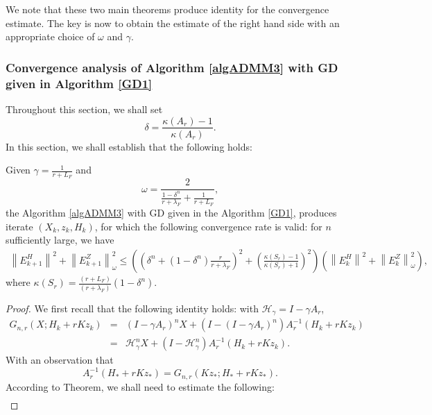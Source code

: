 \begin{itemize}
We note that these two main theorems produce identity for the convergence estimate. The key is now to obtain the estimate of the right hand side with an appropriate choice of $\omega$ and $\gamma$. 

\subsubsection{Convergence analysis of Algorithm \ref{algADMM3} with GD given in Algorithm \ref{GD1}}
Throughout this section, we shall set 
\begin{equation}
\delta = \frac{\kappa(A_r)-1}{\kappa(A_r)}. 
\end{equation} 
In this section, we shall establish that the following holds: 
\begin{theorem}\label{main:theorem04} 
Given $\gamma = \frac{1}{r + L_F}$ and \begin{equation}
\omega = \frac{2}{\frac{1 - \delta^n}{r + \lambda_F} + \frac{1}{r+L_F}}, 
\end{equation}
the Algorithm \ref{algADMM3} with GD given in the Algorithm \ref{GD1}, produces iterate $(X_k, z_k, H_k)$, for which the following convergence rate is valid: for $n$ sufficiently large, we have 
\begin{eqnarray*}
\left \|E_{k+1}^H \right \|^2 + \left \|E_{k+1}^Z \right \|_\omega^2 \leq \left ( \left ( \delta^n + (1 - \delta^n) \frac{r}{r+\lambda_F} \right )^2  + \left ( \frac{\kappa(S_r) - 1}{\kappa(S_r) + 1} \right )^2 \right ) \left (\left \|E_{k}^H \right \|^2 + \left \|E_{k}^Z \right \|_\omega^2 \right ), 
\end{eqnarray*}
where $\kappa(S_r) = \frac{(r+L_F)}{(r+\lambda_F)}(1 - \delta^n).$ 
\end{theorem}
\begin{proof} 
We first recall that the following identity holds: with $\mathcal{H}_\gamma = I - \gamma A_r$, 
\begin{eqnarray*}
G_{n,r}(X;H_k + rKz_k) &=& (I - \gamma A_r)^n X + (I - (I - \gamma A_r)^n) A_r^{-1} (H_k + rKz_k) \\
&=& \mathcal{H}_\gamma^n X + (I - \mathcal{H}_\gamma^n) A_r^{-1} (H_k + rKz_k). 
\end{eqnarray*} 
With an observation that 
\begin{equation}
A_r^{-1}(H_* + rKz_*) = G_{n,r}(Kz_*;H_* + rKz_*).  
\end{equation}
According to Theorem, we shall need to estimate the following: 
\begin{eqnarray*}

\end{eqnarray*}
\end{proof}
\end{itemize}
